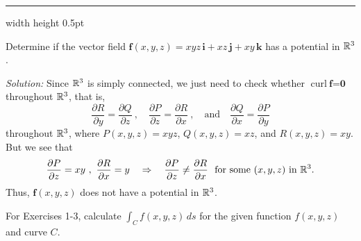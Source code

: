 \vspace{3mm}
\hrule width \textwidth height 0.5pt
\begin{exmp}
 Determine if the vector field $\textbf{f}(x,y,z) = xyz\,\textbf{i} + xz\,\textbf{j} + xy\,\textbf{k}$ has a
 potential in $\mathbb{R}^{3}$.\vspace{1mm}
 \par\noindent\emph{Solution:} Since $\mathbb{R}^{3}$ is simply connected, we just need to check whether $\text{curl}~
 \textbf{f} = \textbf{0}$ throughout $\mathbb{R}^{3}$, that is,
 \begin{displaymath}
  \frac{\partial R}{\partial y} = \frac{\partial Q}{\partial z}~,\quad
  \frac{\partial P}{\partial z} = \frac{\partial R}{\partial x}~,\quad\text{and}\quad
  \frac{\partial Q}{\partial x} = \frac{\partial P}{\partial y}
 \end{displaymath}
 throughout $\mathbb{R}^{3}$, where $P(x,y,z)=xyz$, $Q(x,y,z)=xz$, and $R(x,y,z)=xy$. But we see that
 \begin{displaymath}
  \frac{\partial P}{\partial z} = xy ~,~ \frac{\partial R}{\partial x} = y \quad\Rightarrow\quad
  \frac{\partial P}{\partial z} \ne \frac{\partial R}{\partial x} ~~\text{for some $(x,y,z)$ in $\mathbb{R}^{3}$.}
 \end{displaymath}
 Thus, $\textbf{f}(x,y,z)$ does not have a potential in $\mathbb{R}^{3}$.
\end{exmp}
\startexercises\label{sec4dot5}
\par\noindent For Exercises 1-3, calculate $\int_C f(x,y,z)\,ds$ for the given function $f(x,y,z)$ and
curve $C$.
